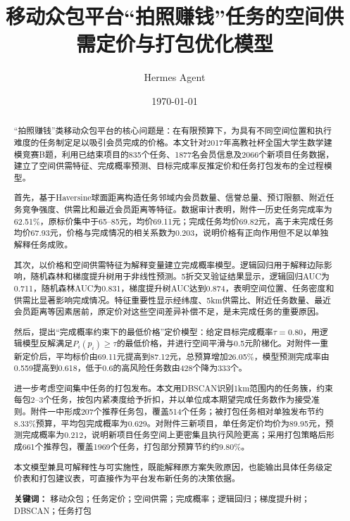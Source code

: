 \documentclass[UTF8,a4paper,12pt]{ctexart}
\title{移动众包平台``拍照赚钱''任务的空间供需定价与打包优化模型}
\author{Hermes Agent}
\date{\today}
\begin{document}
\maketitle

\begin{abstract}
``拍照赚钱''类移动众包平台的核心问题是：在有限预算下，为具有不同空间位置和执行难度的任务制定足以吸引会员完成的价格。本文针对2017年高教社杯全国大学生数学建模竞赛B题，利用已结束项目的835个任务、1877名会员信息及2066个新项目任务数据，建立了空间供需特征、完成概率预测、目标完成率反推定价和任务打包发布的全过程模型。

首先，基于Haversine球面距离构造任务邻域内会员数量、信誉总量、预订限额、附近任务竞争强度、供需比和最近会员距离等特征。数据审计表明，附件一历史任务完成率为62.51\%，原标价集中于65--85元，均价69.11元；完成任务均价69.82元，高于未完成任务均价67.93元，价格与完成情况的相关系数为0.203，说明价格有正向作用但不足以单独解释任务成败。

其次，以价格和空间供需特征为解释变量建立完成概率模型。逻辑回归用于解释边际影响，随机森林和梯度提升树用于非线性预测。5折交叉验证结果显示，逻辑回归AUC为0.711，随机森林AUC为0.831，梯度提升树AUC达到0.874，表明空间位置、任务密度和供需比显著影响完成情况。特征重要性显示经纬度、5km供需比、附近任务数量、最近会员距离等因素居前，原定价对这些空间差异补偿不足，是未完成任务的重要原因。

然后，提出``完成概率约束下的最低价格''定价模型：给定目标完成概率$\tau=0.80$，用逻辑模型反解满足$P_i(p_i)\ge\tau$的最低价格，并进行空间平滑与0.5元阶梯化。对附件一重新定价后，平均标价由69.11元提高到87.12元，总预算增加26.05\%，模型预测完成率由0.559提高到0.618，低于0.6的高风险任务数由428个降为333个。

进一步考虑空间集中任务的打包发布。本文用DBSCAN识别1km范围内的任务簇，约束每包2--3个任务，按包内紧凑度给予折扣，并以单位成本期望完成任务数作为接受准则。附件一中形成207个推荐任务包，覆盖514个任务；被打包任务相对单独发布节约8.33\%预算，平均包完成概率为0.629。对附件三新项目，单任务定价均价为89.95元，预测完成概率为0.212，说明新项目任务空间上更密集且执行风险更高；采用打包策略后形成661个推荐包，覆盖1969个任务，打包部分预算节约约9.80\%。

本文模型兼具可解释性与可实施性，既能解释原方案失败原因，也能输出具体任务级定价表和打包建议表，可直接作为平台发布新任务的决策依据。

\textbf{关键词：} 移动众包；任务定价；空间供需；完成概率；逻辑回归；梯度提升树；DBSCAN；任务打包
\end{abstract}

\newpage
\tableofcontents
\newpage
\end{document}
